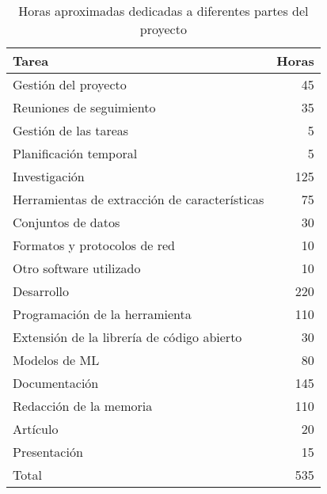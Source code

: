 \begin{table}[H]
  \centering
  \begin{tabular}{|l | r |}
      \hline
      \rowcolor{lightgray} \textbf{Tarea}                & \textbf{Horas}       \\  
      \hline
      \rowcolor{lightgray} Gestión del proyecto     &  45                  \\
      Reuniones de seguimiento                      &  35                  \\
      Gestión de las tareas                         &   5                  \\
      Planificación temporal                        &   5                  \\  
      \hline
      \rowcolor{lightgray} Investigación            & 125                  \\
      Herramientas de extracción de características  &  75                  \\
      Conjuntos de datos                            &  30                  \\
      Formatos y protocolos de red                  &  10                  \\
      Otro software utilizado                       &  10                  \\
      \hline
      \rowcolor{lightgray} Desarrollo                & 220                  \\
      Programación de la herramienta                & 110                  \\
      Extensión de la librería de código abierto    &  30                  \\
      Modelos de ML                                 &  80                  \\
      \hline
      \rowcolor{lightgray} Documentación            & 145                  \\
      Redacción de la memoria                       & 110                  \\
      Artículo                                      &  20                  \\
      Presentación                                  &  15                  \\
      \hline
      \rowcolor{lightgray} Total                    & 535                  \\
      \hline
  \end{tabular}
  \caption{Horas aproximadas dedicadas a diferentes partes del proyecto}
  \label{table:horasdedicadas}
\end{table}

